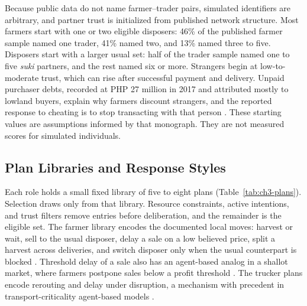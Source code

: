 \documentclass{icsthesis}
\begin{document}
\begin{mainmatter}
			Because public data do not name farmer--trader pairs, simulated identifiers are arbitrary, and partner trust is initialized from published network structure. Most farmers start with one or two eligible disposers: 46\% of the published farmer sample named one trader, 41\% named two, and 13\% named three to five. Disposers start with a larger usual set: half of the trader sample named one to five \emph{suki} partners, and the rest named six or more. Strangers begin at low-to-moderate trust, which can rise after successful payment and delivery. Unpaid purchaser debts, recorded at PHP 27 million in 2017 and attributed mostly to lowland buyers, explain why farmers discount strangers, and the reported response to cheating is to stop transacting with that person \citep{deGuzmanBambicoBaconguis2023}. These starting values are assumptions informed by that monograph. They are not measured scores for simulated individuals.

		\subsection{Plan Libraries and Response Styles}

			Each role holds a small fixed library of five to eight plans (Table~\ref{tab:ch3-plans}). Selection draws only from that library. Resource constraints, active intentions, and trust filters remove entries before deliberation, and the remainder is the eligible set. The farmer library encodes the documented local moves: harvest or wait, sell to the usual disposer, delay a sale on a low believed price, split a harvest across deliveries, and switch disposer only when the usual counterpart is blocked \citep{deGuzmanBambicoBaconguis2023}. Threshold delay of a sale also has an agent-based analog in a shallot market, where farmers postpone sales below a profit threshold \citep{Nurlina2024}. The trucker plans encode rerouting and delay under disruption, a mechanism with precedent in transport-criticality agent-based models \citep{Colon2021}.


\end{mainmatter}
\end{document}
